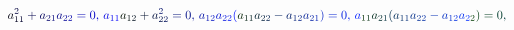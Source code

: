\documentclass[12pt]{article}
\begin{document}
\makeatletter
\renewcommand*{\@textcolor}[3]{%
  \protect\leavevmode
  \begingroup
    \color#1{#2}#3%
  \endgroup
}
\makeatother
\begin{displaymath}
\mathcolor[RGB]{0,0,15}{a} _ { \mathcolor[RGB]{0,0,30}{1} \mathcolor[RGB]{0,0,45}{1} } ^ { \mathcolor[RGB]{0,0,60}{2} } \mathcolor[RGB]{0,0,75}{+} \mathcolor[RGB]{0,0,90}{a} _ { \mathcolor[RGB]{0,0,105}{2} \mathcolor[RGB]{0,0,120}{1} } \mathcolor[RGB]{0,0,135}{a} _ { \mathcolor[RGB]{0,0,150}{2} \mathcolor[RGB]{0,0,165}{2} } \mathcolor[RGB]{0,0,180}{=} \mathcolor[RGB]{0,0,195}{0} \mathcolor[RGB]{0,0,210}{,} \mathcolor[RGB]{0,0,225}{\,
a} _ { \mathcolor[RGB]{0,0,240}{1} \mathcolor[RGB]{0,0,255}{1} } \mathcolor[RGB]{0,15,0}{a} _ { \mathcolor[RGB]{0,15,15}{1} \mathcolor[RGB]{0,15,30}{2} } \mathcolor[RGB]{0,15,45}{+} \mathcolor[RGB]{0,15,60}{a} _ { \mathcolor[RGB]{0,15,75}{2} \mathcolor[RGB]{0,15,90}{2} } ^ { \mathcolor[RGB]{0,15,105}{2} } \mathcolor[RGB]{0,15,120}{=} \mathcolor[RGB]{0,15,135}{0} \mathcolor[RGB]{0,15,150}{,} \mathcolor[RGB]{0,15,165}{\,
a} _ { \mathcolor[RGB]{0,15,180}{1} \mathcolor[RGB]{0,15,195}{2} } \mathcolor[RGB]{0,15,210}{a} _ { \mathcolor[RGB]{0,15,225}{2} \mathcolor[RGB]{0,15,240}{2} } \mathcolor[RGB]{0,15,255}{(} \mathcolor[RGB]{0,30,0}{a} _ { \mathcolor[RGB]{0,30,15}{1} \mathcolor[RGB]{0,30,30}{1} } \mathcolor[RGB]{0,30,45}{a} _ { \mathcolor[RGB]{0,30,60}{2} \mathcolor[RGB]{0,30,75}{2} } \mathcolor[RGB]{0,30,90}{-} \mathcolor[RGB]{0,30,105}{a} _ { \mathcolor[RGB]{0,30,120}{1} \mathcolor[RGB]{0,30,135}{2} } \mathcolor[RGB]{0,30,150}{a} _ { \mathcolor[RGB]{0,30,165}{2} \mathcolor[RGB]{0,30,180}{1} } \mathcolor[RGB]{0,30,195}{)} \mathcolor[RGB]{0,30,210}{=} \mathcolor[RGB]{0,30,225}{0} \mathcolor[RGB]{0,30,240}{,} \mathcolor[RGB]{0,30,255}{\,
a} _ { \mathcolor[RGB]{0,45,0}{1} \mathcolor[RGB]{0,45,15}{1} } \mathcolor[RGB]{0,45,30}{a} _ { \mathcolor[RGB]{0,45,45}{2} \mathcolor[RGB]{0,45,60}{1} } \mathcolor[RGB]{0,45,75}{(} \mathcolor[RGB]{0,45,90}{a} _ { \mathcolor[RGB]{0,45,105}{1} \mathcolor[RGB]{0,45,120}{1} } \mathcolor[RGB]{0,45,135}{a} _ { \mathcolor[RGB]{0,45,150}{2} \mathcolor[RGB]{0,45,165}{2} } \mathcolor[RGB]{0,45,180}{-} \mathcolor[RGB]{0,45,195}{a} _ { \mathcolor[RGB]{0,45,210}{1} \mathcolor[RGB]{0,45,225}{2} } \mathcolor[RGB]{0,45,240}{a} _ { \mathcolor[RGB]{0,45,255}{2} \mathcolor[RGB]{0,60,0}{2} } \mathcolor[RGB]{0,60,15}{)} \mathcolor[RGB]{0,60,30}{=} \mathcolor[RGB]{0,60,45}{0} \mathcolor[RGB]{0,60,60}{,} \mathcolor[RGB]{0,60,75}{\,
}
\end{displaymath}
\end{document}
